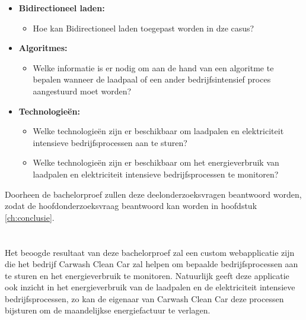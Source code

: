 \begin{itemize}
  \item \textbf{Bidirectioneel laden:}
  \begin{itemize}
    \item Hoe kan Bidirectioneel laden toegepast worden in dze casus?
  \end{itemize}
  \item \textbf{Algoritmes:}
  \begin{itemize}
    \item Welke informatie is er nodig om aan de hand van een algoritme te bepalen wanneer de laadpaal of een ander bedrijfsintensief proces aangestuurd moet worden?
  \end{itemize}
  \item \textbf{Technologieën:}
  \begin{itemize}
    \item Welke technologieën zijn er beschikbaar om laadpalen en elektriciteit intensieve bedrijfsprocessen aan te sturen?
    \item Welke technologieën zijn er beschikbaar om het energieverbruik van laadpalen en elektriciteit intensieve bedrijfsprocessen te monitoren?
  \end{itemize}
\end{itemize}

Doorheen de bachelorproef zullen deze deelonderzoeksvragen beantwoord worden, zodat de hoofdonderzoeksvraag beantwoord kan worden in hoofdstuk \ref{ch:conclusie}.

\section{}%
\label{sec:onderzoeksdoelstelling}

Het beoogde resultaat van deze bachelorproef zal een custom webapplicatie zijn die het bedrijf Carwash Clean Car zal helpen om bepaalde bedrijfsprocessen aan te sturen en het energieverbruik te monitoren. Natuurlijk geeft deze applicatie ook inzicht in het energieverbruik van de laadpalen en de elektriciteit intensieve bedrijfsprocessen, zo kan de eigenaar van Carwash Clean Car deze processen bijsturen om de maandelijkse energiefactuur te verlagen.

\section{}%
\label{sec:opzet-bachelorproef}

